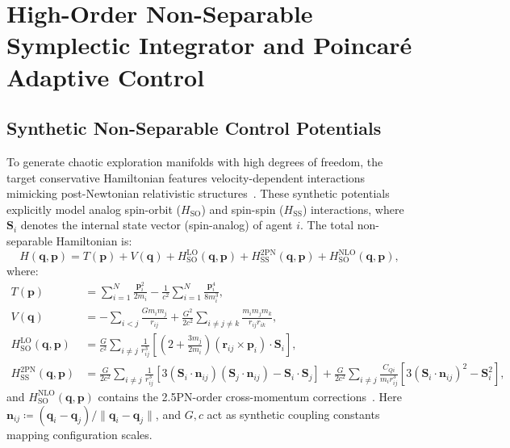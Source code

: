 \documentclass[11pt,a4paper,reqno]{article}
\theoremstyle{plain}
\theoremstyle{definition}
\theoremstyle{remark}
\numberwithin{equation}{section}
\begin{document}
\section{High-Order Non-Separable Symplectic Integrator and Poincaré Adaptive Control}

\subsection{Synthetic Non-Separable Control Potentials}
To generate chaotic exploration manifolds with high degrees of freedom, the target conservative Hamiltonian features velocity-dependent interactions mimicking post-Newtonian relativistic structures~\cite{Blanchet2014}. These synthetic potentials explicitly model analog spin-orbit ($H_{\mathrm{SO}}$) and spin-spin ($H_{\mathrm{SS}}$) interactions, where $\bm{S}_i$ denotes the internal state vector (spin-analog) of agent $i$. The total non-separable Hamiltonian is:
\begin{equation}
H(\bm{q}, \bm{p}) = T(\bm{p}) + V(\bm{q}) + H_{\mathrm{SO}}^{\mathrm{LO}}(\bm{q}, \bm{p}) + H_{\mathrm{SS}}^{\mathrm{2PN}}(\bm{q}, \bm{p}) + H_{\mathrm{SO}}^{\mathrm{NLO}}(\bm{q}, \bm{p}),
\label{eq:total_hamiltonian}
\end{equation}
where:
\begin{align}
T(\bm{p}) &= \sum_{i=1}^N \frac{\bm{p}_i^2}{2 m_i} - \frac{1}{c^2} \sum_{i=1}^N \frac{\bm{p}_i^4}{8 m_i^3}, \label{eq:kinetic_pn} \\
V(\bm{q}) &= -\sum_{i < j} \frac{G m_i m_j}{r_{ij}} + \frac{G^2}{2 c^2} \sum_{i \neq j \neq k} \frac{m_i m_j m_k}{r_{ij} r_{ik}}, \label{eq:potential_pn} \\
H_{\mathrm{SO}}^{\mathrm{LO}}(\bm{q}, \bm{p}) &= \frac{G}{c^2} \sum_{i \neq j} \frac{1}{r_{ij}^3} \left[ \left(2 + \frac{3 m_j}{2 m_i}\right) (\bm{r}_{ij} \times \bm{p}_i) \cdot \bm{S}_i \right], \label{eq:so_lo} \\
H_{\mathrm{SS}}^{\mathrm{2PN}}(\bm{q}, \bm{p}) &= \frac{G}{2 c^2} \sum_{i \neq j} \frac{1}{r_{ij}^3} \left[ 3 (\bm{S}_i \cdot \bm{n}_{ij})(\bm{S}_j \cdot \bm{n}_{ij}) - \bm{S}_i \cdot \bm{S}_j \right] + \frac{G}{2 c^2} \sum_{i \neq j} \frac{C_{Qi}}{m_i r_{ij}^3} \left[ 3 (\bm{S}_i \cdot \bm{n}_{ij})^2 - \bm{S}_i^2 \right], \label{eq:ss_2pn}
\end{align}
and $H_{\mathrm{SO}}^{\mathrm{NLO}}(\bm{q}, \bm{p})$ contains the 2.5PN-order cross-momentum corrections~\cite{DamourJaranowskiSchafer2008}. Here $\bm{n}_{ij} \coloneqq (\bm{q}_i - \bm{q}_j) / \|\bm{q}_i - \bm{q}_j\|$, and $G, c$ act as synthetic coupling constants mapping configuration scales. 
\end{document}
